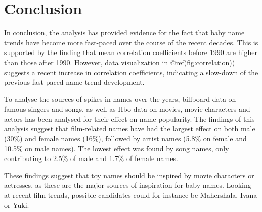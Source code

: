 \documentclass[11pt,preprint]{elsarticle}
\numberwithin{equation}{section}
\numberwithin{figure}{section}
\numberwithin{table}{section}
\begin{document}
\section{Conclusion}\label{conclusion}

In conclusion, the analysis has provided evidence for the fact that baby
name trends have become more fast-paced over the course of the recent
decades. This is supported by the finding that mean correlation
coefficients before 1990 are higher than those after 1990. However, data
visualization in @ref(fig:correlation)) suggests a recent increase in
correlation coefficients, indicating a slow-down of the previous
fast-paced name trend development.

To analyse the sources of spikes in names over the years, billboard data
on famous singers and songs, as well as Hbo data on movies, movie
characters and actors has been analysed for their effect on name
popularity. The findings of this analysis suggest that film-related
names have had the largest effect on both male (30\%) and female names
(16\%), followed by artist names (5.8\% on female and 10.5\% on male
names). The lowest effect was found by song names, only contributing to
2.5\% of male and 1.7\% of female names.

These findings suggest that toy names should be inspired by movie
characters or actresses, as these are the major sources of inspiration
for baby names. Looking at recent film trends, possible candidates could
for instance be Mahershala, Ivana or Yuki.

\newpage


\end{document}
